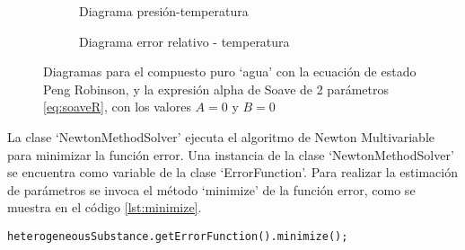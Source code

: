 \begin{figure}[!h]
   \begin{subfigure}[t]{.5\textwidth}
        \caption{Diagrama presión-temperatura}
        \label{fig:pressuretemperature}
    \end{subfigure}
    \qquad
    \begin{subfigure}[t]{.5\textwidth}
		\caption{Diagrama error relativo - temperatura}\label{fig:relativeerrorbefore}
	\end{subfigure}
	\caption{Diagramas para el compuesto puro `agua' con la ecuación de estado Peng Robinson, y la expresión alpha de Soave de 2 parámetros \ref{eq:soaveR}, con los valores $A =0$ y $B =0$}\label{fig:ptdiagrambefore}
\end{figure}


	La clase `NewtonMethodSolver' ejecuta el algoritmo de Newton Multivariable para minimizar la función error. Una instancia de la clase `NewtonMethodSolver' se encuentra como variable de la clase `ErrorFunction'. Para realizar la estimación de parámetros se invoca el método `minimize' de la función error, como se muestra en el código \ref{lst:minimize}.

	\begin{lstlisting}[label={lst:minimize},caption={Estimación de los parámetros al minimizar el valor de la función error.}]
		heterogeneousSubstance.getErrorFunction().minimize();
	\end{lstlisting}

